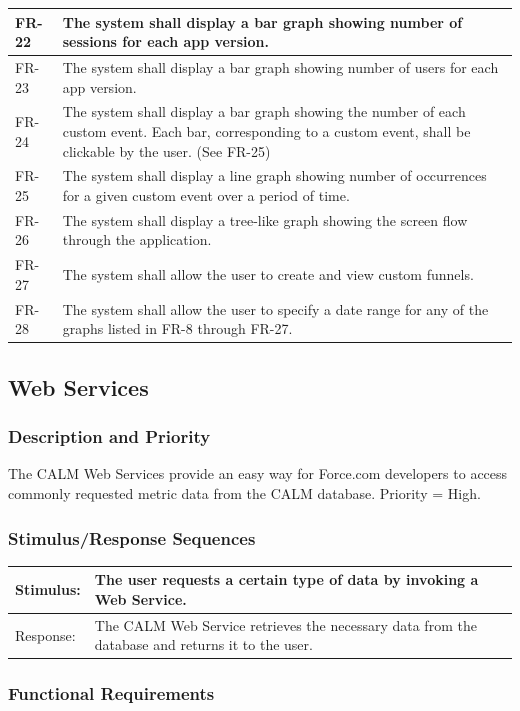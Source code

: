 \documentclass[12pt,oneside,letterpaper]{article}
\begin{document}
\begin{longtable}{|l|p{3.8in}|}
\hline
FR-22&The system shall display a bar graph showing number of sessions for each app version.\\
\hline
FR-23&The system shall display a bar graph showing number of users for each app version.\\
\hline
FR-24&The system shall display a bar graph showing the number of each custom event. Each bar, corresponding to a custom event, shall be clickable by the user. (See FR-25)\\
\hline
FR-25&The system shall display a line graph showing number of occurrences for a given custom event over a period of time.\\
\hline
FR-26&The system shall display a tree-like graph showing the screen flow through the application.\\
\hline
FR-27&The system shall allow the user to create and view custom funnels.\\
\hline
FR-28&The system shall allow the user to specify a date range for any of the graphs listed in FR-8 through FR-27.\\
\hline
\end{longtable}

\subsection{Web Services}
\subsubsection{Description and Priority}
The CALM Web Services provide an easy way for Force.com developers to access commonly requested metric data from the CALM database.
\newline Priority = High.
\subsubsection{Stimulus/Response Sequences}

\begin{longtable}{|l|p{3.8in}|}
\hline
Stimulus:&The user requests a certain type of data by invoking a Web Service.\\
\hline
Response:&The CALM Web Service retrieves the necessary data from the database and returns it to the user.\\
\hline
\end{longtable}
 
\subsubsection{Functional Requirements}
\end{document}
